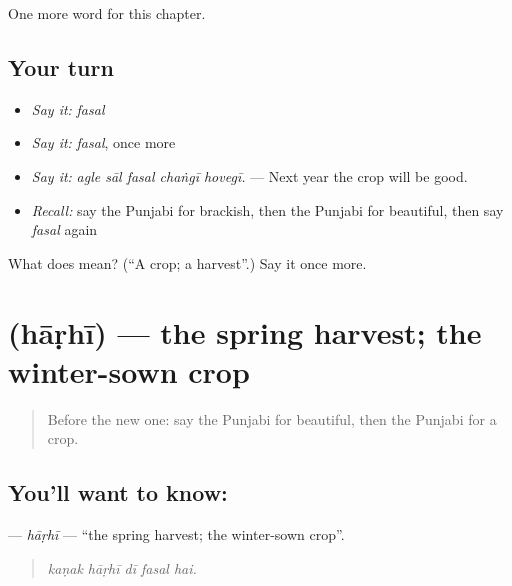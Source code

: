 \begin{grammarlens}[title={What you've built}]
One more word for this chapter.
\end{grammarlens}

\subsection*{Your turn}
\begin{itemize}
\raggedright
  \item \emph{Say it:} \emph{fasal}
  \item \emph{Say it:} \emph{fasal}, once more
  \item \emph{Say it:} \emph{agle sāl fasal chaṅgī hovegī.} — Next year the crop will be good.
  \item \emph{Recall:} say the Punjabi for brackish, then the Punjabi for beautiful, then say \emph{fasal} again
\end{itemize}

\begin{tcolorbox}[breakable,colback=teal!4,colframe=teal!35!black,title={Before you move on}]
What does  mean? (\textquotedblleft{}A crop; a harvest\textquotedblright{}.) Say it once more.
\end{tcolorbox}
\section[\texorpdfstring{\pa{ਹਾੜ੍ਹੀ} (hāṛhī)}{ਹਾੜ੍ਹੀ (hāṛhī)}]{ (hāṛhī) — the spring harvest; the winter-sown crop}

\label{lesson:PA-C300-harhi}



\begin{quote}
Before the new one: say the Punjabi for beautiful, then the Punjabi for a crop.
\end{quote}

\subsection*{You'll want to know: }
\textbf{} — \emph{hāṛhī} — \textquotedblleft{}the spring harvest; the winter-sown crop\textquotedblright{}.

\begin{quote}
    
\end{quote}

\begin{quote}
\emph{kaṇak hāṛhī dī fasal hai.}
\end{quote}

